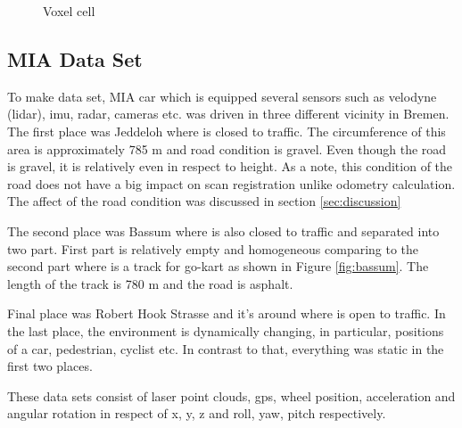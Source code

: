 \begin{figure}[h]
\centering
{}
 \caption{Voxel cell }
 \label{fig:voxel}
\end{figure}
\subsection{MIA Data Set}\label{MIA-set}
To make data set, MIA car which is equipped several sensors such as velodyne (lidar), imu, radar, cameras etc. was driven in three different vicinity in Bremen. The first place was Jeddeloh where is closed to traffic. The circumference of this area is approximately 785 m and road condition is gravel. Even though the road is gravel, it is relatively even in respect to height. As a note, this condition of the road does not have a big impact on scan registration unlike odometry calculation. The affect of the road condition was discussed in section \ref{sec:discussion}
\\ 
\par The second place was Bassum where is also closed to traffic and separated into two part. First part is relatively empty and homogeneous comparing to the second part where is a track for go-kart as shown in Figure \ref{fig:bassum}. The length of the track is 780 m and the road is asphalt.
\\ 
\par Final place was Robert Hook Strasse and it's around where is open to traffic. In the last place, the environment is dynamically changing, in particular,  positions of a car, pedestrian, cyclist etc. In contrast to that, everything was static in the first two places.  
\\ 
\par These data sets consist of laser point clouds, gps, wheel position, acceleration and angular rotation in respect of x, y, z and roll, yaw, pitch respectively.

